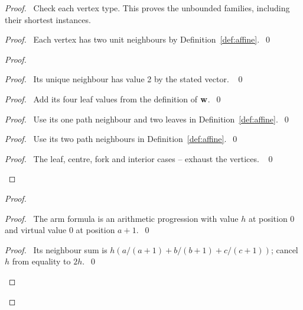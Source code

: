 \begin{proof}
\pfsketch\ Check each vertex type. This proves the unbounded families,
including their shortest instances.
\begin{proof}\pf\ Each vertex has two unit neighbours by
Definition~\ref{def:affine}.~\qed\end{proof}
\begin{proof}
\begin{proof}\pf\ Its unique neighbour has value 2 by the stated vector. ~\qed\end{proof}
\begin{proof}\pf\ Add its four leaf values from the definition of ${\mathbf w}$.~\qed\end{proof}
\begin{proof}\pf\ Use its one path neighbour and two leaves in
Definition~\ref{def:affine}.~\qed\end{proof}
\begin{proof}\pf\ Use its two path neighbours in Definition~\ref{def:affine}.~\qed\end{proof}
\qedstep
\begin{proof}\pf\ The leaf, centre, fork and interior cases
-- exhaust the vertices. ~\qed\end{proof}
\end{proof}
\begin{proof}
\begin{proof}\pf\ The arm formula is an arithmetic progression with
value $h$ at position 0 and virtual value 0 at position $a+1$.~\qed\end{proof}
\begin{proof}\pf\ Its neighbour sum is
$h(a/(a+1)+b/(b+1)+c/(c+1))$; cancel $h$ from equality to $2h$.~\qed\end{proof}

\end{proof}
\end{proof}
